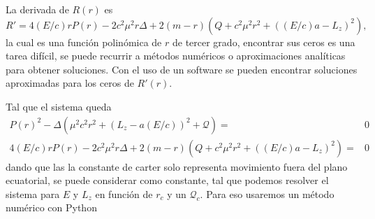 La derivada de $R(r)$ es
\begin{equation}
    R' = 4 (E/c) r P(r)-2 c^2 \mu^2 r \Delta+2(m-r)\left(Q+c^2 \mu^2 r^2+\left((E/c) a-L_z\right)^2\right),
\end{equation}
la cual es una función polinómica de $r$ de tercer grado, encontrar sus ceros es una tarea difícil, se puede recurrir a métodos numéricos o aproximaciones analíticas para obtener soluciones.
Con el uso de un software se pueden encontrar soluciones aproximadas para los ceros de $R'(r)$.

Tal que el sistema queda
\begin{equation}
    \begin{aligned}
        P(r)^2-\Delta\left(\mu^2 c^2 r^2+\left(L_z-a(E / c)\right)^2+\mathcal{Q}\right)  =                 & 0 \\
        4 (E/c) r P(r)-2 c^2 \mu^2 r \Delta+2(m-r)\left(Q+c^2 \mu^2 r^2+\left((E/c) a-L_z\right)^2\right)= & 0
    \end{aligned}
\end{equation}
dando que las la constante de carter solo representa movimiento fuera del plano ecuatorial, se puede considerar como constante, tal que podemos resolver el sistema para $E$ y $L_z$ en función de $r_c$ y un $\mathcal{Q}_c$.
Para eso usaremos un método numérico con Python
